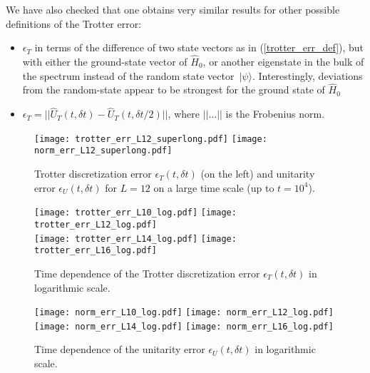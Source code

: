 \documentclass[10pt,amsmath,amssymb,twocolumn,superscriptaddress,groupedaddress,nofootinbib,aps,prd,twocolumn]{revtex4-2}
\newcommand{\lr}[1]{\left(#1\right)}
\newcommand{\ket}[1]{ \, | #1 \rangle }
\begin{document}
We have also checked that one obtains very similar results for other possible definitions of the Trotter error:
\begin{itemize}
 \item $\epsilon_T$ in terms of the difference of two state vectors as in (\ref{trotter_err_def}), but with either the ground-state vector of $\hat{H}_0$, or another eigenstate in the bulk of the spectrum instead of the random state vector $\ket{\psi}$. Interestingly, deviations from the random-state appear to be strongest for the ground state of $\hat{H}_0$
 \item $\epsilon_T = || \hat{U}_T\lr{t, {\delta} t} - \hat{U}_T\lr{t, {\delta} t/2} ||$, where $||\ldots||$ is the Frobenius norm.
\end{itemize}

\begin{figure*}[h!pb]
  \centering
  \texttt{[image: trotter\_err\_L12\_superlong.pdf]}
  \texttt{[image: norm\_err\_L12\_superlong.pdf]}\\
  \caption{Trotter discretization error $\epsilon_T\lr{t, {\delta t}}$ (on the left) and unitarity error $\epsilon_U\lr{t, {\delta} t}$ for $L=12$ on a large time scale (up to $t = 10^4$).}
  \label{fig:trotter_err_superlong}
\end{figure*}

\begin{figure*}[h!pb]
  \centering
  \texttt{[image: trotter\_err\_L10\_log.pdf]}
  \texttt{[image: trotter\_err\_L12\_log.pdf]}\\
  \texttt{[image: trotter\_err\_L14\_log.pdf]}
  \texttt{[image: trotter\_err\_L16\_log.pdf]}\\
  \caption{Time dependence of the Trotter discretization error $\epsilon_T\lr{t, {\delta t}}$ in logarithmic scale.}
  \label{fig:trotter_err_logscale}
\end{figure*}

\begin{figure*}[h!pb]
  \centering
  \texttt{[image: norm\_err\_L10\_log.pdf]}
  \texttt{[image: norm\_err\_L12\_log.pdf]}\\
  \texttt{[image: norm\_err\_L14\_log.pdf]}
  \texttt{[image: norm\_err\_L16\_log.pdf]}\\
  \caption{Time dependence of the unitarity error $\epsilon_U\lr{t, {\delta t}}$ in logarithmic scale.}
  \label{fig:norm_err_logscale}
\end{figure*}
\end{document}
